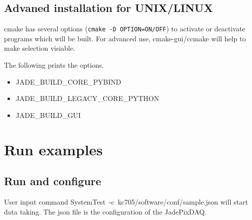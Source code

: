 \documentclass[12pt,a4paper]{article}
\begin{document}
\subsection{Advaned installation for UNIX/LINUX}
\label{advaned-installation-for-unixlinux}

cmake has several options (\texttt{cmake\ -D\ OPTION=ON/OFF}) to
activate or deactivate programs which will be built. For advanced use,
cmake-gui/ccmake will help to make selection visiable.

The following prints the options.

\begin{itemize}
	\item
	      JADE\_BUILD\_CORE\_PYBIND
	\item
	      JADE\_BUILD\_LEGACY\_CORE\_PYTHON
	\item
	      JADE\_BUILD\_GUI
\end{itemize}

\section{Run examples}
\label{run-examples}

\subsection{Run and configure}
\label{run-and-configure}

User input command SystemTest\ -c\ kc705/software/conf/sample.json will start data
taking. The json file is the configuration of the JadePixDAQ.
\end{document}

